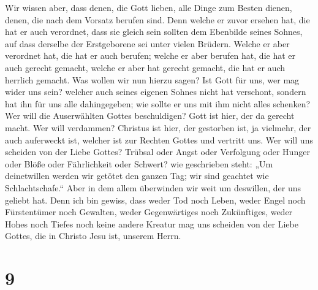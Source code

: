  Wir wissen aber, dass denen, die Gott lieben, alle Dinge
zum Besten dienen, denen, die nach dem Vorsatz berufen sind.
 Denn welche er zuvor ersehen hat, die hat er auch
verordnet, dass sie gleich sein sollten dem Ebenbilde seines Sohnes, auf
dass derselbe der Erstgeborene sei unter vielen Brüdern. 
Welche er aber verordnet hat, die hat er auch berufen; welche er aber
berufen hat, die hat er auch gerecht gemacht, welche er aber hat gerecht
gemacht, die hat er auch herrlich gemacht.  Was wollen
wir nun hierzu sagen? Ist Gott für uns, wer mag wider uns sein?
 welcher auch seines eigenen Sohnes nicht hat verschont,
sondern hat ihn für uns alle dahingegeben; wie sollte er uns mit ihm
nicht alles schenken?  Wer will die Auserwählten Gottes
beschuldigen? Gott ist hier, der da gerecht macht.  Wer
will verdammen? Christus ist hier, der gestorben ist, ja vielmehr, der
auch auferweckt ist, welcher ist zur Rechten Gottes und vertritt uns.
 Wer will uns scheiden von der Liebe Gottes? Trübsal oder
Angst oder Verfolgung oder Hunger oder Blöße oder Fährlichkeit oder
Schwert?  wie geschrieben steht: „Um deinetwillen werden
wir getötet den ganzen Tag; wir sind geachtet wie Schlachtschafe.``
 Aber in dem allem überwinden wir weit um deswillen, der
uns geliebt hat.  Denn ich bin gewiss, dass weder Tod
noch Leben, weder Engel noch Fürstentümer noch Gewalten, weder
Gegenwärtiges noch Zukünftiges,  weder Hohes noch Tiefes
noch keine andere Kreatur mag uns scheiden von der Liebe Gottes, die in
Christo Jesu ist, unserem Herrn.

\hypertarget{section-8}{%
\section{9}\label{section-8}}

